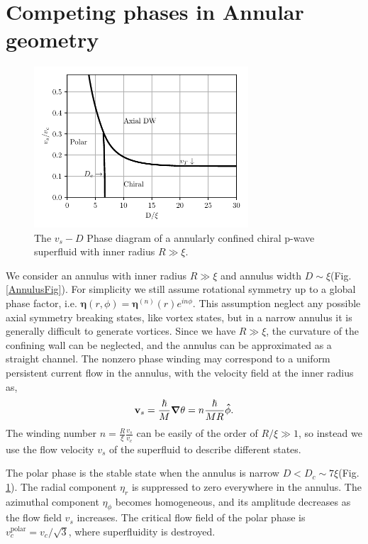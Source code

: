 \documentclass[aps,prb,reprint,groupedaddress]{revtex4-2}
\begin{document}
\section{Competing phases in Annular geometry}\label{sec:annulus}

\begin{figure}
    \centering
    \includegraphics[width=8cm]{phase_diagram.pdf}
    \caption{The $v_s-D$ Phase diagram of a annularly confined chiral p-wave superfluid with inner radius $R\gg\xi$.}
    \label{PhaseDiagram}
\end{figure}

We consider an annulus with inner radius $R\gg\xi$ and annulus width
$D\sim\xi$(Fig. \ref{AnnulusFig}). For simplicity we still assume rotational symmetry
up to a global phase factor, i.e. $\bm{\eta}(r,\phi)=\bm{\eta}^{(n)}(r)e ^{in\phi}$.
This assumption neglect any possible axial symmetry breaking states, like vortex
states, but in a narrow annulus it is generally difficult to generate vortices.
Since we have $R\gg\xi$, the curvature of the confining wall can be neglected,
and the annulus can be approximated as a straight channel. The nonzero phase
winding may correspond to a uniform persistent current flow in
the annulus, with the velocity field at the inner radius as,
\begin{align}\label{vs}
    \vb{v}_s=\frac{\hbar}{M}\grad\theta=n\frac{\hbar}{MR}\vu{\phi}.
\end{align}
The winding number $n=\frac{R}{\xi}\frac{v_s}{v_c}$ can be easily of the order of
$R/\xi\gg1$, so instead we use the flow velocity $v_s$ of the superfluid to describe
different states.

The polar phase is the stable state when the annulus is narrow
$D<D_c\sim 7\xi$(Fig. \ref{PhaseDiagram}). The
radial component $\eta_r$ is suppressed to zero everywhere in the annulus.
The azimuthal component $\eta_\phi$ becomes homogeneous, and its amplitude decreases
as the flow field $v_s$ increases. The critical flow field of the polar phase is
$v_c^\text{polar}=v_c/\sqrt{3}$, where superfluidity is destroyed.
\end{document}
